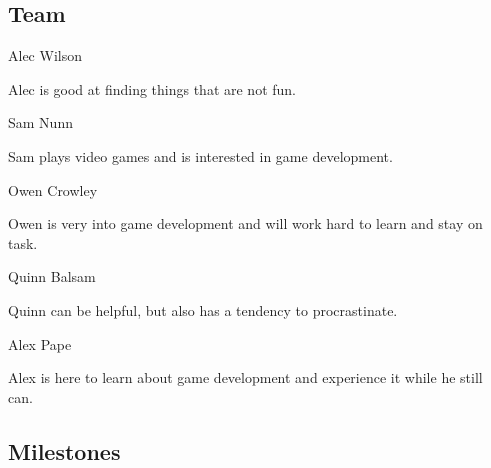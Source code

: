 \documentclass[11pt]{article}
\begin{document}
\subsection{{\color{blue}Team}}

{\large {\color{orange}Alec Wilson}}

Alec is good at finding things that are not fun.


{\large {\color{orange}Sam Nunn}}

Sam plays video games and is interested in game development.

{\large {\color{orange}Owen Crowley}}

Owen is very into game development and will work hard to learn and stay on task.

{\large {\color{orange}Quinn Balsam}}

Quinn can be helpful, but also has a tendency to procrastinate.

{\large {\color{orange}Alex Pape}}

Alex is here to learn about game development and experience it while he still can.

\subsection{{\color{blue}Milestones}}
\end{document}
